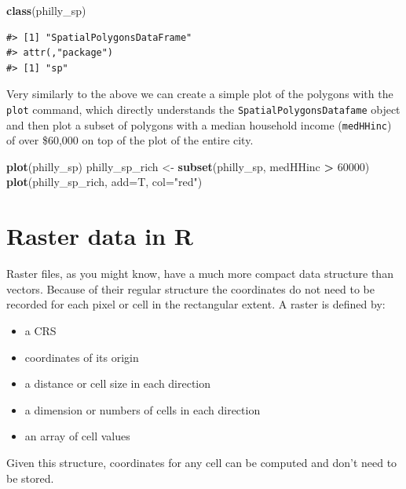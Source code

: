 \documentclass[]{book}
\newenvironment{Shaded}{\begin{snugshade}}{\end{snugshade}}
\newcommand{\KeywordTok}[1]{\textcolor[rgb]{0.13,0.29,0.53}{\textbf{#1}}}
\newcommand{\DataTypeTok}[1]{\textcolor[rgb]{0.13,0.29,0.53}{#1}}
\newcommand{\DecValTok}[1]{\textcolor[rgb]{0.00,0.00,0.81}{#1}}
\newcommand{\StringTok}[1]{\textcolor[rgb]{0.31,0.60,0.02}{#1}}
\newcommand{\OperatorTok}[1]{\textcolor[rgb]{0.81,0.36,0.00}{\textbf{#1}}}
\newcommand{\NormalTok}[1]{#1}
\providecommand{\tightlist}{%
  \setlength{\itemsep}{0pt}\setlength{\parskip}{0pt}}
\begin{document}
\begin{Shaded}
\begin{Highlighting}[]
\KeywordTok{class}\NormalTok{(philly_sp)}
\end{Highlighting}
\end{Shaded}

\begin{verbatim}
#> [1] "SpatialPolygonsDataFrame"
#> attr(,"package")
#> [1] "sp"
\end{verbatim}

Very similarly to the above we can create a simple plot of the polygons
with the \texttt{plot} command, which directly understands the
\texttt{SpatialPolygonsDatafame} object and then plot a subset of
polygons with a median household income (\texttt{medHHinc}) of over
\$60,000 on top of the plot of the entire city.

\begin{Shaded}
\begin{Highlighting}[]
\KeywordTok{plot}\NormalTok{(philly_sp)}
\NormalTok{philly_sp_rich <-}\StringTok{ }\KeywordTok{subset}\NormalTok{(philly_sp, medHHinc }\OperatorTok{>}\StringTok{ }\DecValTok{60000}\NormalTok{)}
\KeywordTok{plot}\NormalTok{(philly_sp_rich, }\DataTypeTok{add=}\NormalTok{T, }\DataTypeTok{col=}\StringTok{"red"}\NormalTok{)}
\end{Highlighting}
\end{Shaded}

\section{Raster data in R}\label{raster-data-in-r}

Raster files, as you might know, have a much more compact data structure
than vectors. Because of their regular structure the coordinates do not
need to be recorded for each pixel or cell in the rectangular extent. A
raster is defined by:

\begin{itemize}
\tightlist
\item
  a CRS
\item
  coordinates of its origin
\item
  a distance or cell size in each direction
\item
  a dimension or numbers of cells in each direction
\item
  an array of cell values
\end{itemize}

Given this structure, coordinates for any cell can be computed and don't
need to be stored.
\end{document}
